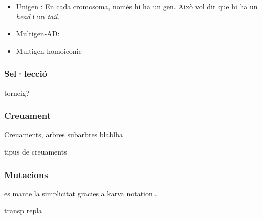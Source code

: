 \documentclass[titlepage,a4paper,12pt]{book}
\begin{document}
\begin{itemize}
	\item Unigen : En cada cromosoma, només hi ha un gen.  Això vol dir que hi
	ha un \emph{head} i un \emph{tail}.
	\item Multigen-AD:
	\item Multigen homoiconic

\end{itemize}

\subsubsection{Sel·lecció} %
\label{ssub:Seleccio}
torneig?

\subsubsection{Creuament} %
\label{ssub:Creuament}

Creuaments, arbres subarbres blablba

tipus de creuaments

\subsubsection{Mutacions} %
\label{ssub:Mutacions}

es mante la simplicitat gracies a karva notation\ldots

transp
repla


\end{document}

